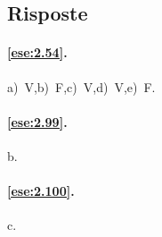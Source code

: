 \subsection{Risposte}

\begingroup
\hypersetup{linkcolor=black}

\paragraph{\ref{ese:2.54}.}
a)~V,\quad b)~F,\quad c)~V,\quad d)~V,\quad e)~F.

\paragraph{\ref{ese:2.99}.}
b.

\paragraph{\ref{ese:2.100}.}
c.

\endgroup
